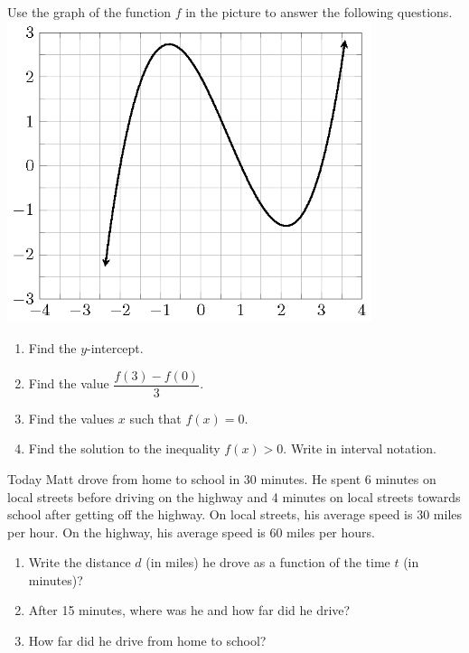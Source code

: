 \begin{exercise}

Use the graph of the function \(f\) in the picture to answer the
following questions.
\\
\includegraphics[width=0.8\textwidth]{figs/function-exercise-cubic.png}

\begin{enumerate}[twocol]
\item
  Find the \(y\)-intercept.
\item
  Find the value \(\dfrac{f(3)-f(0)}{3}.\)
\item
  Find the values \(x\) such that \(f(x)=0\).
\item
  Find the solution to the inequality \(f(x)>0\). Write in interval
  notation.
\end{enumerate}
\end{exercise}
\vspace*{2\baselineskip}

\begin{exercise}

Today Matt drove from home to school in 30 minutes. He spent 6 minutes
on local streets before driving on the highway and 4 minutes on local
streets towards school after getting off the highway. On local streets,
his average speed is 30 miles per hour. On the highway, his average
speed is 60 miles per hours.

\begin{enumerate}
\item
  Write the distance \(d\) (in miles) he drove as a function of the time
  \(t\) (in minutes)?
\item
  After 15 minutes, where was he and how far did he drive?
\item
  How far did he drive from home to school?
\end{enumerate}

\end{exercise}
